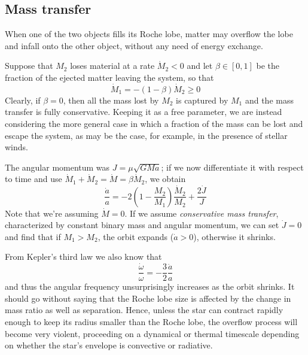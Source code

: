 \subsection{Mass transfer}
When one of the two objects fills its Roche lobe, matter may overflow the lobe and infall onto the other object, without any need of energy exchange.
\par Suppose that $M_{2}$ loses material at a rate $\dot{M}_{2}<0$ and let $\beta \in [0,1]$ be the fraction of the ejected matter leaving the system, so that 
\begin{equation*}
    \dot{M}_{1} = -(1-\beta)\dot{M}_{2} \geq 0
\end{equation*}
Clearly, if $\beta = 0$, then all the mass lost by $M_{2}$ is captured by $M_{1}$ and the mass transfer is fully conservative. Keeping it as a free parameter, we are instead considering the more
general case in which a fraction of the mass can be lost and escape the system, as may be the case, for example, in the presence of stellar winds.
\par The angular momentum was $J = \mu\sqrt{GMa}$; if we now differentiate it with respect to time and use $\dot{M}_{1}+\dot{M}_{2} = \dot{M} = \beta\dot{M}_{2}$, we obtain 
\begin{equation}
    \frac{\dot{a}}{a} = -2\left(1-\frac{M_{2}}{M_{1}}\right)\frac{\dot{M}_{2}}{M_{2}}+\frac{2\dot{J}}{J}
\end{equation}
Note that we're assuming $\dot{M} = 0$. If we assume \emph{conservative mass transfer}, characterized by constant binary mass and angular momentum, we can set $\dot{J} = 0$ and find that if $M_{1} > M_{2}$, the orbit expands ($\dot{a}>0$), otherwise it shrinks.
\par From Kepler's third law we also know that
\begin{equation*}
    \frac{\dot{\omega}}{\omega} = -\frac{3}{2}\frac{\dot{a}}{a}
\end{equation*}
and thus the angular frequency unsurprisingly increases as the orbit shrinks. It should go without saying that the Roche lobe size is affected by the change in mass ratio as well as separation. Hence, unless the star can contract rapidly enough to keep its radius smaller than the Roche lobe, the overflow process will become very violent, proceeding on a dynamical or thermal timescale depending on whether the star’s envelope is convective or radiative.
